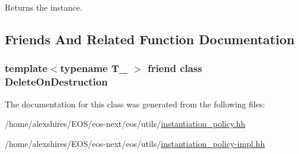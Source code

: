 Returns the instance. 

\subsection{Friends And Related Function Documentation}
\hypertarget{classeos_1_1InstantiationPolicy_3_01T___00_01Singleton_01_4_a015c2abc647885b46b47d0ba104140b1}{
\subsubsection[{DeleteOnDestruction}]{\setlength{\rightskip}{0pt plus 5cm}template$<$typename T\_\- $>$ friend class DeleteOnDestruction}}
\label{classeos_1_1InstantiationPolicy_3_01T___00_01Singleton_01_4_a015c2abc647885b46b47d0ba104140b1}


The documentation for this class was generated from the following files:\begin{DoxyCompactItemize}
\item 
/home/alexshires/EOS/eos-\/next/eos/utils/\hyperlink{instantiation__policy_8hh}{instantiation\_\-policy.hh}\item 
/home/alexshires/EOS/eos-\/next/eos/utils/\hyperlink{instantiation__policy-impl_8hh}{instantiation\_\-policy-\/impl.hh}\end{DoxyCompactItemize}
